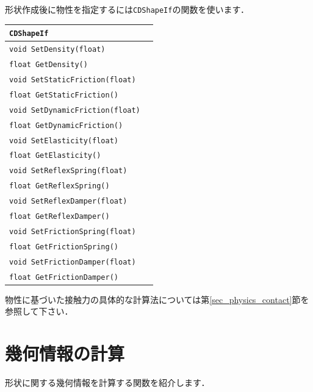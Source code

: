 \KLUDGE 形状作成後に物性を指定するには\texttt{CDShapeIf}\KLUDGE の関数を使います．

\begin{center}
\begin{tabular}{lll}
\multicolumn{3}{l}{\texttt{CDShapeIf}}						\\ \midrule
\multicolumn{2}{l}{\texttt{void SetDensity(float)}}				& \\
\multicolumn{2}{l}{\texttt{float GetDensity()}}					& \\
\multicolumn{2}{l}{\texttt{void SetStaticFriction(float)}}		& \\
\multicolumn{2}{l}{\texttt{float GetStaticFriction()}}			& \\
\multicolumn{2}{l}{\texttt{void SetDynamicFriction(float)}}		& \\
\multicolumn{2}{l}{\texttt{float GetDynamicFriction()}}			& \\
\multicolumn{2}{l}{\texttt{void SetElasticity(float)}}			& \\
\multicolumn{2}{l}{\texttt{float GetElasticity()}}				& \\
\multicolumn{2}{l}{\texttt{void SetReflexSpring(float)}}		& \\
\multicolumn{2}{l}{\texttt{float GetReflexSpring()}}			& \\
\multicolumn{2}{l}{\texttt{void SetReflexDamper(float)}}		& \\
\multicolumn{2}{l}{\texttt{float GetReflexDamper()}}			& \\
\multicolumn{2}{l}{\texttt{void SetFrictionSpring(float)}}		& \\
\multicolumn{2}{l}{\texttt{float GetFrictionSpring()}}			& \\
\multicolumn{2}{l}{\texttt{void SetFrictionDamper(float)}}		& \\
\multicolumn{2}{l}{\texttt{float GetFrictionDamper()}}			& \\
\end{tabular}
\end{center}

\KLUDGE 物性に基づいた接触力の具体的な計算法については第\ref{sec_physics_contact}\KLUDGE 節を参照して下さい．

\section{\KLUDGE 幾何情報の計算}

\KLUDGE 形状に関する幾何情報を計算する関数を紹介します．

